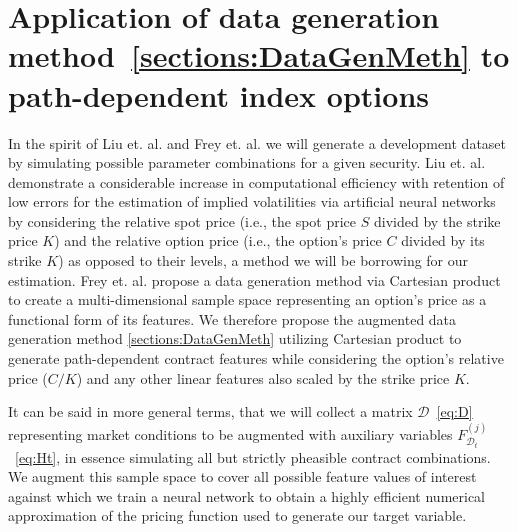 \documentclass[11pt]{article}
\newcommand{\D}{\mathcal{D}}
\begin{document}
\section{Application of data generation method~\ref{sections:DataGenMeth} to path-dependent index options}
	\label{sections:specrationale}
	In the spirit of Liu et. al. \cite{liu_2019_pricing} and Frey et. al. \cite{frey_2022_option} we will generate a development dataset by simulating possible parameter combinations for a given security. Liu et. al. \cite{liu_2019_pricing} demonstrate a considerable increase in computational efficiency with retention of low errors for the estimation of implied volatilities via artificial neural networks by considering the relative spot price (i.e., the spot price $S$ divided by the strike price $K$) and the relative option price (i.e., the option's price $C$ divided by its strike $K$) as opposed to their levels, a method we will be borrowing for our estimation. Frey et. al. \cite{frey_2022_option} propose a data generation method via Cartesian product to create a multi-dimensional sample space representing an option's price as a functional form of its features. We therefore propose the augmented data generation method \ref{sections:DataGenMeth} utilizing Cartesian product to generate path-dependent contract features while considering the option's relative price ($C/K$) and any other linear features also scaled by the strike price $K$.
	\par
	It can be said in more general terms, that we will collect a matrix $\D$~\eqref{eq:D} representing market conditions to be augmented with auxiliary variables $F^{(j)}_{\D_{t}}$~\eqref{eq:Ht}, in essence simulating all but strictly pheasible contract combinations. We augment this sample space to cover all possible feature values of interest against which we train a neural network to obtain a highly efficient numerical approximation of the pricing function used to generate our target variable.
	
\end{document}
